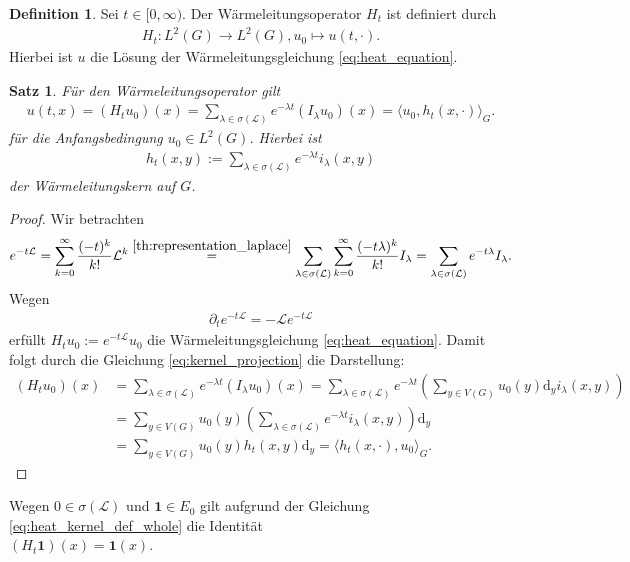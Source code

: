 \documentclass[headsepline,11pt]{scrbook}
\newtheorem{thm}[lem]{Satz}
\theoremstyle{definition}
\newtheorem{df}[lem]{Definition}
\begin{document}
\begin{df}
Sei $ t \in [0,\infty) $.
Der W\"armeleitungsoperator 
$ H_t $ ist definiert durch
\begin{align}\label{eq:definition_heatkernel}
H_t : L^2(G) \to L^2(G),
u_0 \mapsto u(t,\cdot).
\end{align}
Hierbei ist $ u $ die L\"osung der W\"armeleitungsgleichung 
\eqref{eq:heat_equation}.
\end{df}
\begin{thm}\label{th:repres_heat_kernel_global}
	F\"ur den W\"armeleitungsoperator gilt
	\begin{align}\label{eq:heat_kernel_def_whole}
	u(t,x) = (H_t u_0)(x) = 
	\sum \limits_{\lambda \in \sigma(\mathcal{L})} e^{- \lambda t } (I_\lambda u_0) (x) 
	=
	\langle u_0,  h_t(x,\cdot) \rangle_G.
	\end{align}
	f\"ur die Anfangsbedingung $ u_0 \in L^2(G) $.
	Hierbei ist
	\begin{align}
	h_t(x,y) := \sum \limits_{\lambda \in \sigma(\mathcal{L})}
	e^{- \lambda t} i_\lambda(x,y)
	\end{align}
	der W\"armeleitungskern auf $ G $.
\end{thm}

\begin{proof}
	Wir betrachten
	\begin{align*}
	e^{-t \mathcal{L}}
	=
	\sum \limits_{k=0}^\infty
	\frac{(-t)^k}{k!} \mathcal{L}^k
	\overset{\ref{th:representation_laplace}}{=}
	\sum \limits_{\lambda \in \sigma(\mathcal{L})}
	\sum \limits_{k = 0}^\infty \frac{(-t \lambda)^k}{k!} I_\lambda
	=
	\sum \limits_{\lambda \in \sigma(\mathcal{L})} e^{-t \lambda } I_\lambda.
	\end{align*}
	Wegen 
	\begin{align*}
	\partial_t e^{-t \mathcal{L}} = - \mathcal{L} e^{-t \mathcal{L}}
	\end{align*}
	erf\"ullt $ H_t u_0 := e^{-t \mathcal{L}} u_0 $ die W\"armeleitungsgleichung \eqref{eq:heat_equation}.
	Damit folgt durch die Gleichung \eqref{eq:kernel_projection} die Darstellung:
	\begin{align*}
	(H_t u_0)(x) &= 
	\sum \limits_{\lambda \in \sigma(\mathcal{L})} e^{- \lambda t } (I_\lambda u_0) (x) 
	=
	\sum \limits_{\lambda \in \sigma(\mathcal{L})} e^{- \lambda t }
	\left(\sum \limits_{y \in V(G)} u_0(y) \mathrm{d}_y i_\lambda(x,y) \right)\\
	&=
	\sum \limits_{y \in V(G)} u_0(y) \left(\sum \limits_{\lambda \in \sigma(\mathcal{L})} e^{- \lambda t } i_\lambda(x,y) \right) \mathrm{d}_y\\
	&=
	\sum \limits_{y \in V(G)} u_0(y) h_t(x,y) \mathrm{d}_y
	=
	\langle h_t(x,\cdot) ,u_0 \rangle_G.
	\end{align*}
\end{proof}
Wegen $ 0 \in \sigma(\mathcal{L}) $ und $ \mathbf{1} \in E_0 $ gilt aufgrund der Gleichung \eqref{eq:heat_kernel_def_whole}
die Identit\"at\\
$ (H_t \textbf{1})(x) = \textbf{1}(x) $.
\end{document}
